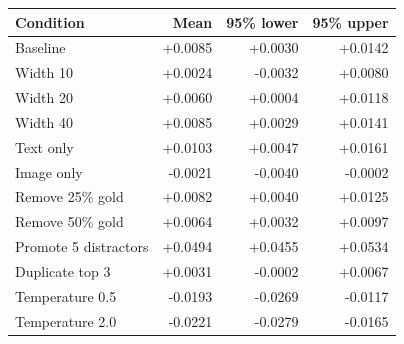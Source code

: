 \begin{tabular}{lrrr}
\toprule
Condition & Mean & 95\% lower & 95\% upper \\
\midrule
Baseline & +0.0085 & +0.0030 & +0.0142 \\
Width 10 & +0.0024 & -0.0032 & +0.0080 \\
Width 20 & +0.0060 & +0.0004 & +0.0118 \\
Width 40 & +0.0085 & +0.0029 & +0.0141 \\
Text only & +0.0103 & +0.0047 & +0.0161 \\
Image only & -0.0021 & -0.0040 & -0.0002 \\
Remove 25\% gold & +0.0082 & +0.0040 & +0.0125 \\
Remove 50\% gold & +0.0064 & +0.0032 & +0.0097 \\
Promote 5 distractors & +0.0494 & +0.0455 & +0.0534 \\
Duplicate top 3 & +0.0031 & -0.0002 & +0.0067 \\
Temperature 0.5 & -0.0193 & -0.0269 & -0.0117 \\
Temperature 2.0 & -0.0221 & -0.0279 & -0.0165 \\
\bottomrule
\end{tabular}
